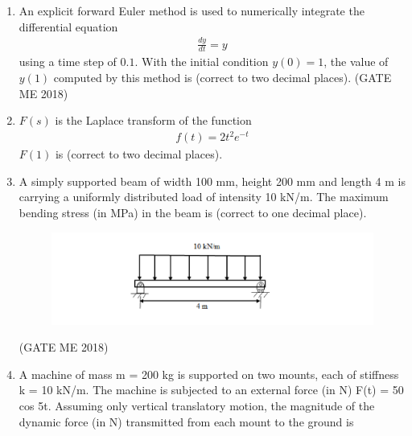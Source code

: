 \documentclass[journal]{IEEEtran}
\numberwithin{equation}{enumi}
\numberwithin{figure}{enumi}
\begin{document}
\begin{enumerate}
  \item An explicit forward Euler method is used to numerically integrate the differential equation 
  \begin{align*}
  \frac{dy}{dt} = y
  \end{align*}
  using a time step of $0.1$. With the initial condition $y(0) = 1$, the value of $y(1)$ computed by this method is \underline{\hspace{3cm}} (correct to two decimal places).
\hfill{(GATE ME 2018)}
  \item $F(s)$ is the Laplace transform of the function 
  \begin{align*}
  f(t) = 2t^2 e^{-t}
  \end{align*}
  $F(1)$ is \underline{\hspace{3cm}} (correct to two decimal places).
  \item A simply supported beam of width 100 mm, height 200 mm and length 4 m is carrying a
uniformly distributed load of intensity 10 kN/m. The maximum bending stress (in MPa) in the beam is 
(correct to one decimal place).
\begin{figure}[H]
    \centering
    \includegraphics[width = 0.6\columnwidth]{figs/fig3.10.png}
    \caption*{}
    \label{fig:Q39}
    \end{figure} 
\hfill{(GATE ME 2018)}
    \item A machine of mass m = 200 kg is supported on two mounts, each of stiffness
k = 10 kN/m. The machine is subjected to an external force (in N) F(t) = 50 cos 5t.
Assuming only vertical translatory motion, the magnitude of the dynamic force (in N)
transmitted from each mount to the ground is


\end{enumerate}
\end{document}
